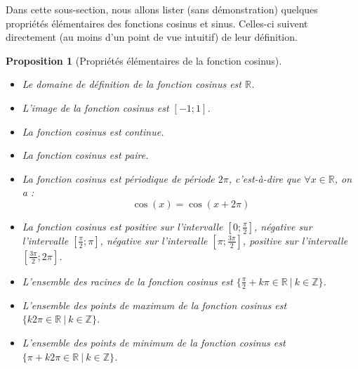 \documentclass[a4paper,fontsize=13pt]{scrreprt}
\theoremstyle{plain}
\newtheorem{pro}[subsection]{Proposition}
\theoremstyle{definition}
\newcommand{\zz}{\mathbb{Z}}
\newcommand{\rr}{\mathbb{R}}
\begin{document}
Dans cette sous-section, nous allons lister (sans démonstration) quelques propriétés élémentaires des fonctions cosinus et sinus. Celles-ci suivent directement (au moins d'un point de vue intuitif) de leur définition.

\begin{pro} [Propriétés élémentaires de la fonction cosinus] ~\\
\begin{itemize}
\item Le domaine de définition de la fonction cosinus est $\rr$.
\item L'image de la fonction cosinus est $[-1;1]$.
\item La fonction cosinus est continue.
\item La fonction cosinus est paire.
\item La fonction cosinus est périodique de période $2\pi$, c'est-à-dire que $\forall x \in \rr$, on a : $$\cos(x) = \cos(x+2\pi)$$
\item La fonction cosinus est positive sur l'intervalle $[0;\frac{\pi}{2}]$, négative sur l'intervalle $[\frac{\pi}{2};\pi]$, négative sur l'intervalle $[\pi;\frac{3\pi}{2}]$, positive sur l'intervalle $[\frac{3\pi}{2};2\pi]$.
\item L'ensemble des racines de la fonction cosinus est $\{\frac{\pi}{2}+k\pi \in \rr~|~k \in \zz \}$.
\item L'ensemble des points de maximum de la fonction cosinus est $\{k2\pi \in \rr~|~k \in \zz \}$.
\item L'ensemble des points de minimum de la fonction cosinus est $\{\pi+k2\pi \in \rr~|~k \in \zz \}$.
\end{itemize}
\end{pro}
\end{document}
